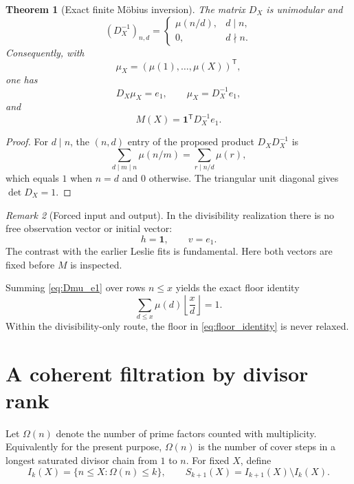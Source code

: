 \documentclass[11pt]{amsart}
\numberwithin{equation}{section}
\theoremstyle{plain}
\newtheorem{theorem}{Theorem}[section]
\theoremstyle{definition}
\theoremstyle{remark}
\newtheorem{remark}[theorem]{Remark}
\begin{document}
\begin{theorem}[Exact finite M\"obius inversion]
\label{thm:finite_mobius_inversion}
The matrix $D_X$ is unimodular and
\begin{equation}
(D_X^{-1})_{n,d}
=
\begin{cases}
\mu(n/d),&d\mid n,\\
0,&d\nmid n.
\end{cases}
\label{eq:divisibility_inverse}
\end{equation}
Consequently, with
\[
\mu_X=(\mu(1),\ldots,\mu(X))^{\mathsf T},
\]
one has
\begin{equation}
D_X\mu_X=e_1,
\qquad
\mu_X=D_X^{-1}e_1,
\label{eq:Dmu_e1}
\end{equation}
and
\begin{equation}
M(X)=\mathbf 1^{\mathsf T}D_X^{-1}e_1.
\label{eq:M_as_incidence_observable}
\end{equation}
\end{theorem}

\begin{proof}
For $d\mid n$, the $(n,d)$ entry of the proposed product
$D_XD_X^{-1}$ is
\[
\sum_{d\mid m\mid n}\mu(n/m)
=
\sum_{r\mid n/d}\mu(r),
\]
which equals $1$ when $n=d$ and $0$ otherwise.  The triangular unit diagonal gives
$\det D_X=1$.
\end{proof}

\begin{remark}[Forced input and output]
\label{rem:forced_h_v}
In the divisibility realization there is no free observation vector or initial vector:
\[
\boxed{h=\mathbf 1,\qquad v=e_1.}
\]
The contrast with the earlier Leslie fits is fundamental.  Here both vectors are fixed before
$M$ is inspected.
\end{remark}

Summing \eqref{eq:Dmu_e1} over rows $n\le x$ yields the exact floor identity
\begin{equation}
\sum_{d\le x}\mu(d)
\left\lfloor\frac xd\right\rfloor
=1.
\label{eq:floor_identity}
\end{equation}
Within the divisibility-only route, the floor in \eqref{eq:floor_identity} is never relaxed.


\section{A coherent filtration by divisor rank}
\label{sec:omega_filtration}

Let $\Omega(n)$ denote the number of prime factors counted with multiplicity.  Equivalently for
the present purpose, $\Omega(n)$ is the number of cover steps in a longest saturated divisor
chain from $1$ to $n$.  For fixed $X$, define
\begin{equation}
I_k(X)=
\{n\le X:\Omega(n)\le k\},
\qquad
S_{k+1}(X)=I_{k+1}(X)\setminus I_k(X).
\label{eq:Ik_Sk}
\end{equation}
\end{document}
